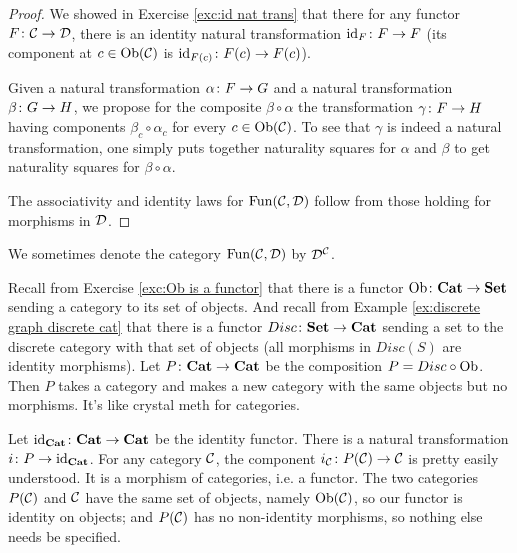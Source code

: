 \begin{proof}

We showed in Exercise \ref{exc:id nat trans} that there for any functor $F\colon\mathcal{C}\rightarrow\mathcal{D}$, there is an identity natural transformation $\textnormal{id}_F\colon F\rightarrow F$ (its component at $c\in\textnormal{Ob}(\mathcal{C})$ is $\textnormal{id}_{F(c)}\colon F(c)\rightarrow F(c)$). 

Given a natural transformation $\alpha\colon F\rightarrow G$ and a natural transformation $\beta\colon G\rightarrow H$, we propose for the composite $\beta\circ\alpha$ the transformation $\gamma\colon F\rightarrow H$ having components $\beta_c\circ\alpha_c$ for every $c\in\textnormal{Ob}(\mathcal{C})$. To see that $\gamma$ is indeed a natural transformation, one simply puts together naturality squares for $\alpha$ and $\beta$ to get naturality squares for $\beta\circ\alpha$. 

The associativity and identity laws for $\textnormal{Fun}(\mathcal{C},\mathcal{D})$ follow from those holding for morphisms in $\mathcal{D}$.

\end{proof}

\begin{notation}
We sometimes denote the category $\textnormal{Fun}(\mathcal{C},\mathcal{D})$ by $\mathcal{D}^\mathcal{C}$. 
\end{notation}

\begin{example}

Recall from Exercise \ref{exc:Ob is a functor} that there is a functor $\textnormal{Ob}\colon{\bf Cat}\rightarrow{\bf Set}$ sending a category to its set of objects. And recall from Example \ref{ex:discrete graph discrete cat} that there is a functor $Disc\colon{\bf Set}\rightarrow{\bf Cat}$ sending a set to the discrete category with that set of objects (all morphisms in $Disc(S)$ are identity morphisms). Let $P\colon{\bf Cat}\rightarrow{\bf Cat}$ be the composition $P=Disc\circ\textnormal{Ob}$. Then $P$ takes a category and makes a new category with the same objects but no morphisms. It's like crystal meth for categories.

Let $\textnormal{id}_{\bf Cat}\colon{\bf Cat}\rightarrow{\bf Cat}$ be the identity functor. There is a natural transformation $i\colon P\rightarrow\textnormal{id}_{\bf Cat}$. For any category $\mathcal{C}$, the component $i_\mathcal{C}\colon P(\mathcal{C})\rightarrow\mathcal{C}$ is pretty easily understood. It is a morphism of categories, i.e. a functor. The two categories $P(\mathcal{C})$ and $\mathcal{C}$ have the same set of objects, namely $\textnormal{Ob}(\mathcal{C})$, so our functor is identity on objects; and $P(\mathcal{C})$ has no non-identity morphisms, so nothing else needs be specified.

\end{example}

